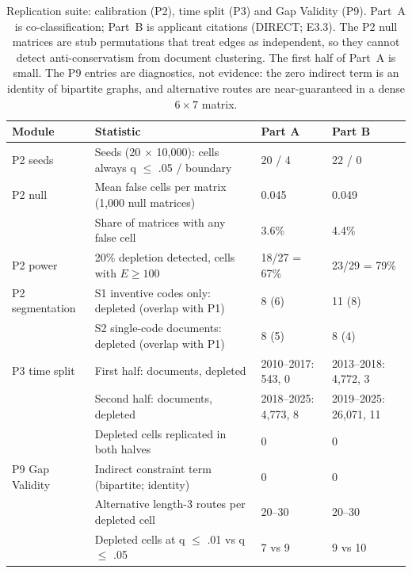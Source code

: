 \begin{table}[tbp]
\centering
\caption{Replication suite: calibration (P2), time split (P3) and Gap Validity (P9). Part~A is co-classification; Part~B is applicant citations (DIRECT; E3.3). The P2 null matrices are stub permutations that treat edges as independent, so they cannot detect anti-conservatism from document clustering. The first half of Part~A is small. The P9 entries are diagnostics, not evidence: the zero indirect term is an identity of bipartite graphs, and alternative routes are near-guaranteed in a dense $6\times7$ matrix.}
\label{tab:app_suite}
\footnotesize
\begin{tabular}{lp{6.0cm}ll}
\toprule
Module & Statistic & Part A & Part B \\
\midrule
P2 seeds & Seeds (20 $\times$ 10,000): cells always q $\leq$ .05 / boundary & 20 / 4 & 22 / 0 \\
P2 null & Mean false cells per matrix (1,000 null matrices) & 0.045 & 0.049 \\
 & Share of matrices with any false cell & 3.6\% & 4.4\% \\
P2 power & 20\% depletion detected, cells with $E\geq100$ & 18/27 = 67\% & 23/29 = 79\% \\
P2 segmentation & S1 inventive codes only: depleted (overlap with P1) & 8 (6) & 11 (8) \\
 & S2 single-code documents: depleted (overlap with P1) & 8 (5) & 8 (4) \\
\midrule
P3 time split & First half: documents, depleted & 2010--2017: 543, 0 & 2013--2018: 4,772, 3 \\
 & Second half: documents, depleted & 2018--2025: 4,773, 8 & 2019--2025: 26,071, 11 \\
 & Depleted cells replicated in both halves & 0 & 0 \\
\midrule
P9 Gap Validity & Indirect constraint term (bipartite; identity) & 0 & 0 \\
 & Alternative length-3 routes per depleted cell & 20--30 & 20--30 \\
 & Depleted cells at q $\leq$ .01 vs q $\leq$ .05 & 7 vs 9 & 9 vs 10 \\
\bottomrule
\end{tabular}
\end{table}

